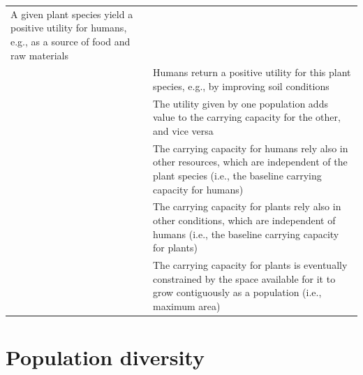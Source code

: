 \documentclass[
]{book}
\begin{document}
\begin{longtable}[]{@{}ll@{}}
\begin{minipage}[t]{0.49\columnwidth}
A given plant species yield a positive utility for humans, e.g., as a source of food and raw materials\strut
\end{minipage}\tabularnewline
\begin{minipage}[t]{0.45\columnwidth}\raggedright
﻿\strut
\end{minipage} & \begin{minipage}[t]{0.49\columnwidth}\raggedright
Humans return a positive utility for this plant species, e.g., by improving soil conditions\strut
\end{minipage}\tabularnewline
\begin{minipage}[t]{0.45\columnwidth}\raggedright
﻿\strut
\end{minipage} & \begin{minipage}[t]{0.49\columnwidth}\raggedright
The utility given by one population adds value to the carrying capacity for the other, and vice versa\strut
\end{minipage}\tabularnewline
\begin{minipage}[t]{0.45\columnwidth}\raggedright
﻿\strut
\end{minipage} & \begin{minipage}[t]{0.49\columnwidth}\raggedright
The carrying capacity for humans rely also in other resources, which are independent of the plant species (i.e., the baseline carrying capacity for humans)\strut
\end{minipage}\tabularnewline
\begin{minipage}[t]{0.45\columnwidth}\raggedright
﻿\strut
\end{minipage} & \begin{minipage}[t]{0.49\columnwidth}\raggedright
The carrying capacity for plants rely also in other conditions, which are independent of humans (i.e., the baseline carrying capacity for plants)\strut
\end{minipage}\tabularnewline
\begin{minipage}[t]{0.45\columnwidth}\raggedright
﻿\strut
\end{minipage} & \begin{minipage}[t]{0.49\columnwidth}\raggedright
The carrying capacity for plants is eventually constrained by the space available for it to grow contiguously as a population (i.e., maximum area)\strut
\end{minipage}\tabularnewline
\bottomrule
\end{longtable}

\newpage

\hypertarget{population-diversity}{%
\section*{Population diversity}\label{population-diversity}}
\end{document}
